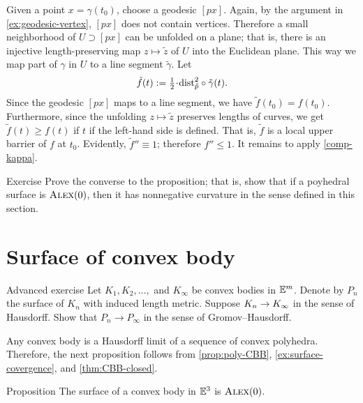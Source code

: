 Given a point $x=\gamma(t_0)$, choose a geodesic $[px]$.
Again, by the argument in \ref{ex:geodesic-vertex}, $[px]$ does not contain vertices.
Therefore a small neighborhood of $U\supset [px]$ can be unfolded on a plane;
that is, there is an injective length-preserving map $z\mapsto \tilde z$
of $U$ into the Euclidean plane.
This way we map part of $\gamma$ in $U$ to a line segment $\tilde\gamma$.
Let
\[\tilde f(t)\df\tfrac12\cdot\distfun_{\tilde p}^2\circ\tilde \gamma(t).\]
Since the geodesic $[px]$ maps to a line segment, we have $\tilde f(t_0)= f(t_0)$.
Furthermore, since the unfolding $z\mapsto \tilde z$ preserves lengths of curves, we get
$\tilde f(t)\ge f(t)$ if $t$ if the left-hand side is defined.
That is, $\tilde f$ is a local upper barrier of $f$ at $t_0$.
Evidently, $\tilde f''\equiv 1$; therefore $f''\le 1$.
It remains to apply \ref{comp-kappa}.
\qeds

\begin{thm}{Exercise}\label{ex:poly-CBB}
Prove the converse to the proposition;
that is, show that if a poyhedral surface is $\textsc{Alex}(0)$, then it has nonnegative curvature in the sense defined in this section.
\end{thm}

\section{Surface of convex body}

\begin{thm}{Advanced exercise}\label{ex:surface-covergence}
Let $K_1,K_2,\dots,$ and $K_\infty$ be convex bodies in $\mathbb{E}^m$.
Denote by $P_n$ the surface of $K_n$ with induced length metric.
Suppose $K_n\to K_\infty$ in the sense of Hausdorff.
Show that $P_n\to P_\infty$ in the sense of Gromov--Hausdorff.
\end{thm}

Any convex body is a Hausdorff limit of a sequence of convex polyhedra.
Therefore, the next proposition follows from \ref{prop:poly-CBB}, \ref{ex:surface-covergence}, and \ref{thm:CBB-closed}.

\begin{thm}{Proposition}\label{prop:conv-surf-CBB(0)}
The surface of a convex body in $\mathbb{E}^3$ is $\textsc{Alex}(0)$.
\end{thm}

